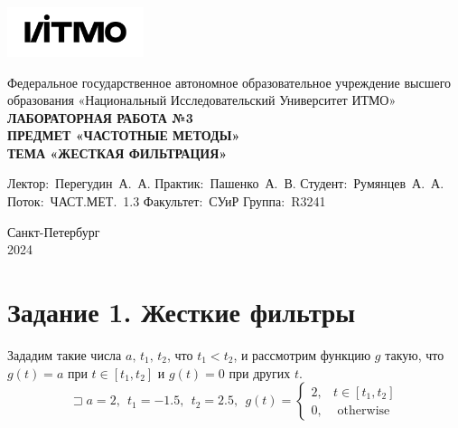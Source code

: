 \documentclass[a4paper, 12pt]{article}
\begin{document}
    \begin{titlepage}

        \begin{center}
        \includegraphics[width=0.3\textwidth]{itmo.png} %
        \vfill
        
        Федеральное государственное автономное образовательное учреждение высшего образования
        «Национальный Исследовательский Университет ИТМО»\\
        
        \vfill
        {\large\bf ЛАБОРАТОРНАЯ РАБОТА №3}\\
        {\large\bf ПРЕДМЕТ «ЧАСТОТНЫЕ МЕТОДЫ»}\\
        {\large\bf ТЕМА «ЖЕСТКАЯ ФИЛЬТРАЦИЯ»}
        \vfill

        \begin{flushright}
            \begin{minipage}{.45\textwidth}
            {
                \hbox{Лектор: Перегудин А. А.}
                \hbox{Практик: Пашенко А. В.}
                \hbox{Студент: Румянцев А. А.}
                \hbox{Поток: ЧАСТ.МЕТ. 1.3}
                \hbox{}
                \hbox{Факультет: СУиР}
                \hbox{Группа: R3241}
            }
            \end{minipage}
        \end{flushright}
        
        \vfill
                
        Санкт-Петербург\\
        2024
        \end{center}
    \end{titlepage}
    
    \tableofcontents

    \newpage
    \section{Задание 1. Жесткие фильтры}
    Зададим такие числа $a,\,t_1,\,t_2$, что $t_1<t_2$, и рассмотрим функцию $g$ такую, что
    $g(t)=a$ при $t\in[t_1,t_2]$ и $g(t)=0$ при других $t$. $$\sqsupset a=2,\ \ t_1=-1.5,\ \ t_2=2.5,\ \ g(t)=
    \begin{cases}
        2, & t\in[t_1,t_2]\\
        0, & \text{ otherwise}
    \end{cases}
    $$
\end{document}
